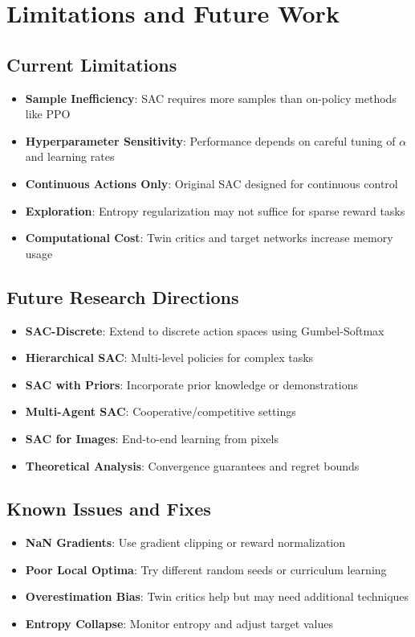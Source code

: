 \documentclass[11pt,a4paper]{article}
\begin{document}
\section{Limitations and Future Work}
\subsection{Current Limitations}
\begin{itemize}
  \item \textbf{Sample Inefficiency}: SAC requires more samples than on-policy methods like PPO
  \item \textbf{Hyperparameter Sensitivity}: Performance depends on careful tuning of $\alpha$ and learning rates
  \item \textbf{Continuous Actions Only}: Original SAC designed for continuous control
  \item \textbf{Exploration}: Entropy regularization may not suffice for sparse reward tasks
  \item \textbf{Computational Cost}: Twin critics and target networks increase memory usage
\end{itemize}

\subsection{Future Research Directions}
\begin{itemize}
  \item \textbf{SAC-Discrete}: Extend to discrete action spaces using Gumbel-Softmax
  \item \textbf{Hierarchical SAC}: Multi-level policies for complex tasks
  \item \textbf{SAC with Priors}: Incorporate prior knowledge or demonstrations
  \item \textbf{Multi-Agent SAC}: Cooperative/competitive settings
  \item \textbf{SAC for Images}: End-to-end learning from pixels
  \item \textbf{Theoretical Analysis}: Convergence guarantees and regret bounds
\end{itemize}

\subsection{Known Issues and Fixes}
\begin{itemize}
  \item \textbf{NaN Gradients}: Use gradient clipping or reward normalization
  \item \textbf{Poor Local Optima}: Try different random seeds or curriculum learning
  \item \textbf{Overestimation Bias}: Twin critics help but may need additional techniques
  \item \textbf{Entropy Collapse}: Monitor entropy and adjust target values
\end{itemize}
\end{document}
